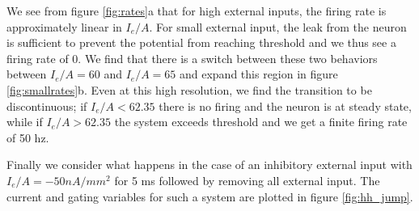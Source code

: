 \documentclass{article}
\begin{document}
We see from figure \ref{fig:rates}a that for high external inputs, the firing rate is approximately linear in $I_e/A$. For small external input, the leak from the neuron is sufficient to prevent the potential from reaching threshold and we thus see a firing rate of 0. We find that there is a switch between these two behaviors between $I_e/A = 60$ and $I_e/A = 65$ and expand this region in figure \ref{fig:smallrates}b. Even at this high resolution, we find the transition to be discontinuous; if $I_e/A < 62.35$ there is no firing and the neuron is at steady state, while if $I_e/A > 62.35$ the system exceeds threshold and we get a finite firing rate of 50 hz.

Finally we consider what happens in the case of an inhibitory external input with $I_e/A = -50 nA/mm^2$ for 5 ms followed by removing all external input. The current and gating variables for such a system are plotted in figure \ref{fig:hh_jump}. 
\end{document}
